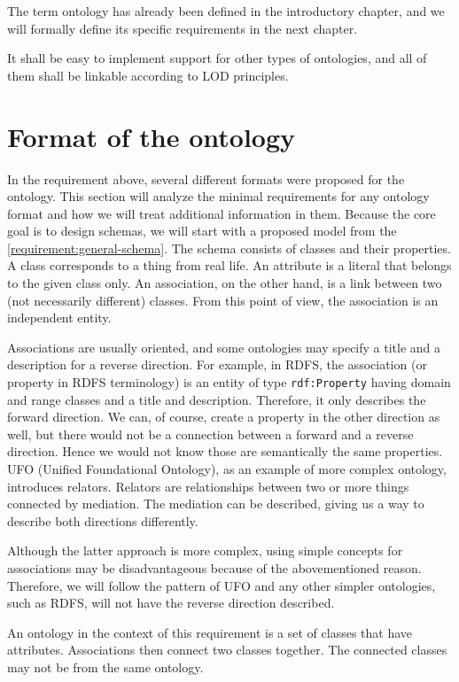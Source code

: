 The term ontology has already been defined in the introductory chapter, and we will formally define its specific requirements in the next chapter.

It shall be easy to implement support for other types of ontologies, and all of them shall be linkable according to LOD principles.

\section*{Format of the ontology}

In the requirement above, several different formats were proposed for the ontology. This section will analyze the minimal requirements for any ontology format and how we will treat additional information in them. Because the core goal is to design schemas, we will start with a proposed model from the \autoref{requirement:general-schema}. The schema consists of classes and their properties. A class corresponds to a thing from real life. An attribute is a literal that belongs to the given class only. An association, on the other hand, is a link between two (not necessarily different) classes. From this point of view, the association is an independent entity.

Associations are usually oriented, and some ontologies may specify a title and a description for a reverse direction. For example, in RDFS, the association (or property in RDFS terminology) is an entity of type {\tt rdf:Property} having domain and range classes and a title and description. Therefore, it only describes the forward direction. We can, of course, create a property in the other direction as well, but there would not be a connection between a forward and a reverse direction. Hence we would not know those are semantically the same properties. UFO (Unified Foundational Ontology), as an example of more complex ontology, introduces relators. Relators are relationships between two or more things connected by mediation. The mediation can be described, giving us a way to describe both directions differently.

Although the latter approach is more complex, using simple concepts for associations may be disadvantageous because of the abovementioned reason. Therefore, we will follow the pattern of UFO and any other simpler ontologies, such as RDFS, will not have the reverse direction described.

\smallskip

An ontology in the context of this requirement is a set of classes that have attributes. Associations then connect two classes together. The connected classes may not be from the same ontology.

